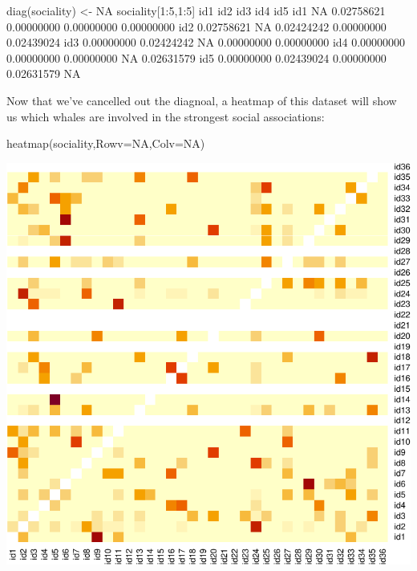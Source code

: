\documentclass[
]{book}
\newenvironment{Shaded}{\begin{snugshade}}{\end{snugshade}}
\newcommand{\AttributeTok}[1]{\textcolor[rgb]{0.77,0.63,0.00}{#1}}
\newcommand{\ConstantTok}[1]{\textcolor[rgb]{0.00,0.00,0.00}{#1}}
\newcommand{\DecValTok}[1]{\textcolor[rgb]{0.00,0.00,0.81}{#1}}
\newcommand{\FloatTok}[1]{\textcolor[rgb]{0.00,0.00,0.81}{#1}}
\newcommand{\FunctionTok}[1]{\textcolor[rgb]{0.00,0.00,0.00}{#1}}
\newcommand{\NormalTok}[1]{#1}
\newcommand{\OtherTok}[1]{\textcolor[rgb]{0.56,0.35,0.01}{#1}}
\newcommand{\SpecialCharTok}[1]{\textcolor[rgb]{0.00,0.00,0.00}{#1}}
\begin{document}
\begin{Shaded}
\begin{Highlighting}[]
\FunctionTok{diag}\NormalTok{(sociality) }\OtherTok{\textless{}{-}} \ConstantTok{NA}
\NormalTok{sociality[}\DecValTok{1}\SpecialCharTok{:}\DecValTok{5}\NormalTok{,}\DecValTok{1}\SpecialCharTok{:}\DecValTok{5}\NormalTok{]}
\NormalTok{           id1        id2        id3        id4        id5}
\NormalTok{id1         }\ConstantTok{NA} \FloatTok{0.02758621} \FloatTok{0.00000000} \FloatTok{0.00000000} \FloatTok{0.00000000}
\NormalTok{id2 }\FloatTok{0.02758621}         \ConstantTok{NA} \FloatTok{0.02424242} \FloatTok{0.00000000} \FloatTok{0.02439024}
\NormalTok{id3 }\FloatTok{0.00000000} \FloatTok{0.02424242}         \ConstantTok{NA} \FloatTok{0.00000000} \FloatTok{0.00000000}
\NormalTok{id4 }\FloatTok{0.00000000} \FloatTok{0.00000000} \FloatTok{0.00000000}         \ConstantTok{NA} \FloatTok{0.02631579}
\NormalTok{id5 }\FloatTok{0.00000000} \FloatTok{0.02439024} \FloatTok{0.00000000} \FloatTok{0.02631579}         \ConstantTok{NA}
\end{Highlighting}
\end{Shaded}

Now that we've cancelled out the diagnoal, a heatmap of this dataset will show us which whales are involved in the strongest social associations:

\begin{Shaded}
\begin{Highlighting}[]
\FunctionTok{heatmap}\NormalTok{(sociality,}\AttributeTok{Rowv=}\ConstantTok{NA}\NormalTok{,}\AttributeTok{Colv=}\ConstantTok{NA}\NormalTok{)}
\end{Highlighting}
\end{Shaded}

\includegraphics{figures/unnamed-chunk-374-1.pdf}
\end{document}

